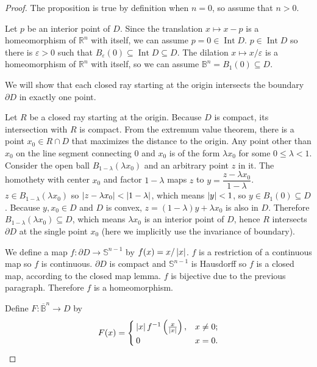 \begin{proof}
	The proposition is true by definition when \( n = 0 \), so assume that \( n > 0 \).

	Let \( p \) be an interior point of \( D \). Since the translation \( x\mapsto x - p \) is a homeomorphism of \( \mathbb{R}^{n} \) with itself, we can assume \( p = 0 \in \operatorname{Int} D \). \( p \in \operatorname{Int} D \) so there is \( \varepsilon > 0 \) such that \( B_{\varepsilon}(0) \subseteq \operatorname{Int} D \subseteq D \). The dilation \( x\mapsto x/\varepsilon \) is a homeomorphism of \( \mathbb{R}^{n} \) with itself, so we can assume \( \mathbb{B}^{n} = B_{1}(0) \subseteq D \).

	We will show that each closed ray starting at the origin intersects the boundary \( \partial D \) in exactly one point.

	Let \( R \) be a closed ray starting at the origin. Because \( D \) is compact, its intersection with \( R \) is compact. From the extremum value theorem, there is a point \( x_{0} \in R\cap D \) that maximizes the distance to the origin. Any point other than \( x_{0} \) on the line segment connecting \( 0 \) and \( x_{0} \) is of the form \( \lambda x_{0} \) for some \( 0\leq \lambda < 1 \). Consider the open ball \( B_{1-\lambda}(\lambda x_{0}) \) and an arbitrary point \( z \) in it. The homothety with center \( x_{0} \) and factor \( 1 - \lambda \) maps \( z \) to \( y = \dfrac{z - \lambda x_{0}}{1 - \lambda} \). \( z \in B_{1 - \lambda}(\lambda x_{0}) \) so \( \left\vert{z - \lambda x_{0}}\right\vert < \left\vert{1 - \lambda}\right\vert \), which means \( \left\vert{y}\right\vert < 1 \), so \( y \in B_{1}(0) \subseteq D \). Because \( y, x_{0} \in D \) and \( D \) is convex, \( z = (1 - \lambda)y + \lambda x_{0} \) is also in \( D \). Therefore \( B_{1 - \lambda}(\lambda x_{0}) \subseteq D \), which means \( \lambda x_{0} \) is an interior point of \( D \), hence \( R \) intersects \( \partial D \) at the single point \( x_{0} \) (here we implicitly use the invariance of boundary).

	We define a map \( f: \partial D \to \mathbb{S}^{n-1} \) by \( f(x) = x/\left\vert{x}\right\vert \). \( f \) is a restriction of a continuous map so \( f \) is continuous. \( \partial D \) is compact and \( \mathbb{S}^{n-1} \) is Hausdorff so \( f \) is a closed map, according to the closed map lemma. \( f \) is bijective due to the previous paragraph. Therefore \( f \) is a homeomorphism.

	Define \( F: \overline{\mathbb{B}}^{n} \to D \) by
	\begin{align*}
		F(x) = \begin{cases}
			       \left\vert{x}\right\vert f^{-1}\left(\frac{x}{\left\vert{x}\right\vert}\right), & x\ne 0; \\
			       0                                             & x = 0.
		       \end{cases}
	\end{align*}


\end{proof}
